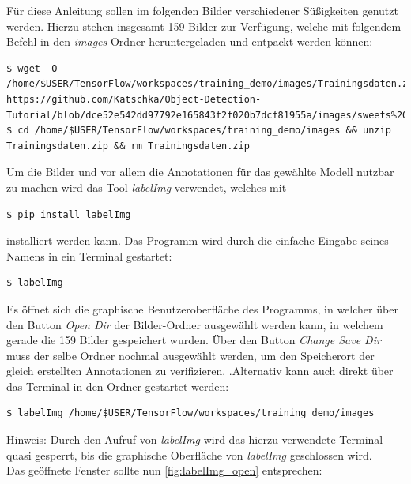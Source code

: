 \documentclass[12pt, oneside]{article}
\begin{document}
Für diese Anleitung sollen im folgenden Bilder verschiedener Süßigkeiten genutzt werden. Hierzu stehen insgesamt 159 Bilder zur Verfügung, welche mit folgendem Befehl in den \textit{images}-Ordner heruntergeladen und entpackt werden können:

\begin{verbatim}    
$ wget -O /home/$USER/TensorFlow/workspaces/training_demo/images/Trainingsdaten.zip https://github.com/Katschka/Object-Detection-Tutorial/blob/dce52e542dd97792e165843f2f020b7dcf81955a/images/sweets%20low%20resolution%20by%20Rami%20Alkhooli.zip
$ cd /home/$USER/TensorFlow/workspaces/training_demo/images && unzip Trainingsdaten.zip && rm Trainingsdaten.zip
\end{verbatim}
Um die Bilder und vor allem die Annotationen für das gewählte Modell nutzbar zu machen wird das Tool \textit{labelImg} verwendet, welches mit

\begin{verbatim}    
$ pip install labelImg
\end{verbatim}
installiert werden kann. Das Programm wird durch die einfache Eingabe seines Namens in ein Terminal gestartet:

\begin{verbatim}    
$ labelImg
\end{verbatim}
Es öffnet sich die graphische Benutzeroberfläche des Programms, in welcher über den Button \textit{Open Dir} der Bilder-Ordner ausgewählt werden kann, in welchem gerade die 159 Bilder gespeichert wurden. Über den Button \textit{Change Save Dir} muss der selbe Ordner nochmal ausgewählt werden, um den Speicherort der gleich erstellten Annotationen zu verifizieren. .Alternativ kann auch direkt über das Terminal in den Ordner gestartet werden:

\begin{verbatim}    
$ labelImg /home/$USER/TensorFlow/workspaces/training_demo/images
\end{verbatim}
Hinweis: Durch den Aufruf von \textit{labelImg} wird das hierzu verwendete Terminal quasi gesperrt, bis die graphische Oberfläche von \textit{labelImg} geschlossen wird.\\

Das geöffnete Fenster sollte nun \autoref{fig:labelImg_open} entsprechen:
\end{document}
